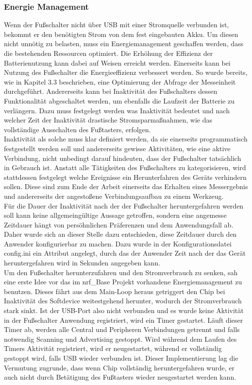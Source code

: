\subsubsection{Energie Management}
Wenn der Fußschalter nicht über \ac{USB} mit einer Stromquelle verbunden ist, bekommt er den benötigten Strom von dem fest eingebauten Akku. Um diesen nicht unnötig zu belasten, muss ein Energiemanagement geschaffen werden, dass die bestehenden Ressourcen optimiert. Die Erhöhung der Effizienz der Batterienutzung kann dabei auf Weisen erreicht werden. Einerseits kann bei Nutzung des Fußschalter die Energieeffizienz verbessert werden. So wurde bereits, wie in Kapitel 3.3 beschrieben, eine Optimierung der Abfrage der Messeinheit durchgeführt. Andererseits kann bei Inaktivität des Fußschalters dessen Funktionalität abgeschaltet werden, um ebenfalls die Laufzeit der Batterie zu verlängern. Dazu muss festgelegt werden was Inaktivität bedeutet und nach welcher Zeit der Inaktivität drastische Stromsparmaßnahmen, wie das vollständige Ausschalten des Fußtasters, erfolgen.\\
Inaktivität als solche muss klar definiert werden, da sie einerseits programmatisch festgestellt werden soll und andererseits gewisse Aktivitäten, wie eine aktive Verbindung, nicht unbedingt darauf hindeuten, dass der Fußschalter tatsächlich in Gebrauch ist. Anstatt alle Tätigkeiten des Fußschalters zu kategorisieren, wird stattdessen festgelegt welche Ereignisse ein Herunterfahren des Geräts verhindern sollen. Diese sind zum Ende der Arbeit einerseits das Erhalten eines Messergebnis und andererseits der angestoßene Verbindungsaufbau zu einem Werkzeug.\\
Für die Dauer der Inaktivität nach der der Fußschalter heruntergefahren werden soll kann keine allgemeingültige Aussage getroffen, sondern eine angemesse Zeitdauer hängt von persöhnlichen Präferenzen und dem Anwendungsfall ab. Daher wurde sich an dieser Stelle dazu entschieden, diese Zeitdauer durch den Anwender konfigurierbar zu machen. Dazu wurde in der Konfigurationsdatei config.ini ein Attribut angelegt, durch das der Anwender Zeit nach der das Gerät heruntergefahren wird in Sekunden angegeben kann.\\
Um den Fußschalter herunterzufahren und den Stromverbrauch zu senken, sah eine erste Idee vor das im nrf\_Base Projekt vorhandene Energiemanagement zu benutzen. Dieses fährt aus dem Main-Loop heraus getriggert den Chip bei Inaktivität des Softdevice weitestgehend herunter, wodurch der Stromverbrauch stark sinkt. Ist der \ac{USB}-Port also nicht verbunden und es wurde keine Aktivität in der Fußschalter Anwendung registriert, wird ein Timer gestartet. Läuft dieser Timer ab, werden alle Central und Peripheren Verbindungen getrennt und falls notwendig Scanning und Advertising gestoppt. Wird während dem Laufen des Timers Aktivität registriert, wird er neugestartet, während er vollständig gestoppt wird, falls \ac{USB} wieder verbunden ist. Dieser Implementierung lag die Vermutung zugrunde, dass wenn Chip vollständig heruntergefahren wurde, er auch nicht durch Betätigung des Fußtasters wieder neugestartet werden kann.\\
